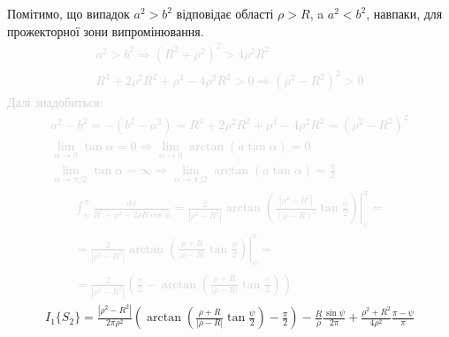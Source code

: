Помітимо, що випадок $ a^2 > b^2 $ відповідає області $ \rho > R $, a 
$ a^2 < b^2 $, навпаки, для прожекторної зони випромінювання.
%
\textcolor{lightgray}{ \begin{equation*} \begin{aligned}
a^2 > b^2  \Rightarrow  
\left( R^2 + \rho^2 \right)^2 > 4 \rho^2 R^2 \\
R^4 + 2 \rho^2 R^2 + \rho^4 - 4 \rho^2 R^2 > 0 \Rightarrow 
\left( \rho^2 - R^2 \right)^2 > 0
\end{aligned} \end{equation*} }
%
\textcolor{lightgray}{ Далі знадобиться: }
%
\textcolor{lightgray}{ \begin{equation*} \begin{aligned}
a^2 - b^2 = - \left( b^2 - a^2 \right) = 
R^4 + 2 \rho^2 R^2 + \rho^4 - 4 \rho^2 R^2 = \left( \rho^2 - R^2 \right)^2 \\
\lim_{\alpha \to 0} \tan{\alpha} = 0 \Rightarrow
\lim_{\alpha \to 0} \arctan \left( a \tan{\alpha} \right) = 0 \\ 
\lim_{\alpha \to \pi/2} \tan{\alpha} = \infty \Rightarrow
\lim_{\alpha \to \pi/2} \arctan \left( a \tan{\alpha} \right) = \frac{\pi}{2}
\end{aligned} \end{equation*} }
%
\textcolor{lightgray}{ \begin{equation*} \begin{aligned}
\int_{\psi}^{\pi} \frac{d \phi}{R^2 + \rho^2 - 2 \rho R \cos \phi} =
\left. \frac{2}{ |\rho^2 - R^2| } \arctan \left( \frac{ |\rho^2 - R^2| }
{\left( \rho - R \right)^2} \tan \frac{\phi}{2} \right)
\right|_{\psi}^{\pi} = \\ = \frac{2}{ |\rho^2 - R^2| } \left.
\arctan \left( \frac{\rho + R}{ |\rho - R| } \tan \frac{\phi}{2} \right)
\right|_{\psi}^{\pi} = \\ = \frac{2}{ |\rho^2 - R^2| } \left( \frac{\pi}{2} -
\arctan \left( \frac{\rho + R}{ |\rho - R| } \tan \frac{\psi}{2} \right) \right)
\end{aligned} \end{equation*} }
%
\begin{equation*} \begin{aligned}
I_1 \{ S_2 \} = \frac{ | \rho^2 - R^2 | }{2 \pi \rho^2} \left(
\arctan \left( \frac{\rho + R}{ | \rho - R | } \tan \frac{\psi}{2} \right) -  
\frac{\pi}{2} \right) - \frac{R}{\rho} \frac{\sin \psi}{2 \pi} + 
\frac{\rho^2 + R^2}{4 \rho^2} \frac{\pi - \psi}{\pi}
\end{aligned} \end{equation*}
